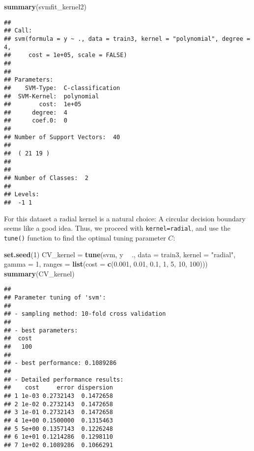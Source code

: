 \documentclass[10pt,ignorenonframetext,]{beamer}
\newenvironment{Shaded}{\begin{snugshade}}{\end{snugshade}}
\newcommand{\KeywordTok}[1]{\textcolor[rgb]{0.13,0.29,0.53}{\textbf{#1}}}
\newcommand{\DataTypeTok}[1]{\textcolor[rgb]{0.13,0.29,0.53}{#1}}
\newcommand{\DecValTok}[1]{\textcolor[rgb]{0.00,0.00,0.81}{#1}}
\newcommand{\FloatTok}[1]{\textcolor[rgb]{0.00,0.00,0.81}{#1}}
\newcommand{\StringTok}[1]{\textcolor[rgb]{0.31,0.60,0.02}{#1}}
\newcommand{\OperatorTok}[1]{\textcolor[rgb]{0.81,0.36,0.00}{\textbf{#1}}}
\newcommand{\NormalTok}[1]{#1}
\begin{document}
\begin{frame}[fragile]

\begin{Shaded}
\begin{Highlighting}[]
\KeywordTok{summary}\NormalTok{(svmfit_kernel2)}
\end{Highlighting}
\end{Shaded}

\begin{verbatim}
## 
## Call:
## svm(formula = y ~ ., data = train3, kernel = "polynomial", degree = 4, 
##     cost = 1e+05, scale = FALSE)
## 
## 
## Parameters:
##    SVM-Type:  C-classification 
##  SVM-Kernel:  polynomial 
##        cost:  1e+05 
##      degree:  4 
##      coef.0:  0 
## 
## Number of Support Vectors:  40
## 
##  ( 21 19 )
## 
## 
## Number of Classes:  2 
## 
## Levels: 
##  -1 1
\end{verbatim}

\normalsize

\end{frame}

\begin{frame}[fragile]

For this dataset a radial kernel is a natural choice: A circular
decision boundary seems like a good idea. Thus, we proceed with
\texttt{kernel=\textquotesingle{}radial\textquotesingle{}}, and use the
\texttt{tune()} function to find the optimal tuning parameter \(C\):

\footnotesize

\begin{Shaded}
\begin{Highlighting}[]
\KeywordTok{set.seed}\NormalTok{(}\DecValTok{1}\NormalTok{)}
\NormalTok{CV_kernel =}\StringTok{ }\KeywordTok{tune}\NormalTok{(svm, y }\OperatorTok{~}\StringTok{ }\NormalTok{., }\DataTypeTok{data =}\NormalTok{ train3, }\DataTypeTok{kernel =} \StringTok{"radial"}\NormalTok{, }\DataTypeTok{gamma =} \DecValTok{1}\NormalTok{, }
    \DataTypeTok{ranges =} \KeywordTok{list}\NormalTok{(}\DataTypeTok{cost =} \KeywordTok{c}\NormalTok{(}\FloatTok{0.001}\NormalTok{, }\FloatTok{0.01}\NormalTok{, }\FloatTok{0.1}\NormalTok{, }\DecValTok{1}\NormalTok{, }\DecValTok{5}\NormalTok{, }\DecValTok{10}\NormalTok{, }\DecValTok{100}\NormalTok{)))}
\KeywordTok{summary}\NormalTok{(CV_kernel)}
\end{Highlighting}
\end{Shaded}

\begin{verbatim}
## 
## Parameter tuning of 'svm':
## 
## - sampling method: 10-fold cross validation 
## 
## - best parameters:
##  cost
##   100
## 
## - best performance: 0.1089286 
## 
## - Detailed performance results:
##    cost     error dispersion
## 1 1e-03 0.2732143  0.1472658
## 2 1e-02 0.2732143  0.1472658
## 3 1e-01 0.2732143  0.1472658
## 4 1e+00 0.1500000  0.1315463
## 5 5e+00 0.1357143  0.1226248
## 6 1e+01 0.1214286  0.1298110
## 7 1e+02 0.1089286  0.1066291
\end{verbatim}

\normalsize

\end{frame}
\end{document}
